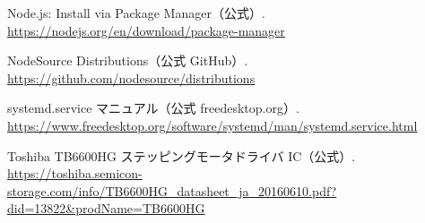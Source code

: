 \documentclass[uplatex,dvipdfmx]{ujarticle}
\begin{document}
\begin{thebibliography}{999}
Node.js: Install via Package Manager（公式）.  
\url{https://nodejs.org/en/download/package-manager}

NodeSource Distributions（公式 GitHub）.  
\url{https://github.com/nodesource/distributions}


systemd.service マニュアル（公式 freedesktop.org）.  
\url{https://www.freedesktop.org/software/systemd/man/systemd.service.html}

Toshiba TB6600HG ステッピングモータドライバ IC（公式）.  
\url{https://toshiba.semicon-storage.com/info/TB6600HG_datasheet_ja_20160610.pdf?did=13822&prodName=TB6600HG}

\end{thebibliography}
\end{document}
